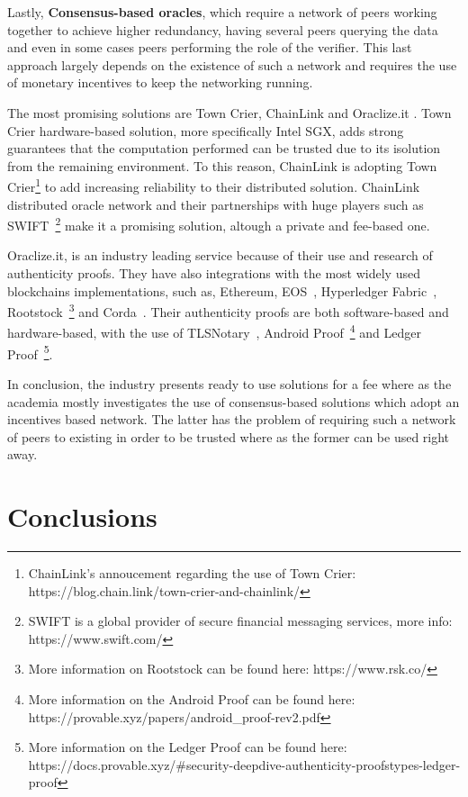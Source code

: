 Lastly, \textbf{Consensus-based oracles}, which require a network of peers working together to achieve higher redundancy, having several peers querying the data and even in some cases peers performing the role of the verifier. This last approach largely depends on the existence of such a network and requires the use of monetary incentives to keep the networking running.

The most promising solutions are Town Crier, ChainLink and Oraclize.it .  Town Crier hardware-based solution, more specifically Intel SGX, adds strong guarantees that the computation performed can be trusted due to its isolution from the remaining environment. To this reason, ChainLink is adopting Town Crier\footnote{ChainLink's annoucement regarding the use of Town Crier: https://blog.chain.link/town-crier-and-chainlink/} to add increasing reliability to their distributed solution. ChainLink distributed oracle network and their partnerships with huge players such as SWIFT~\footnote{SWIFT is a global provider
  of secure financial messaging services, more info: https://www.swift.com/} make it a promising solution, altough a private and fee-based one.

Oraclize.it, is an industry leading service because of their use and research of authenticity proofs. They have also integrations with the most widely used blockchains implementations, such as, Ethereum, EOS~\cite{Block.one2018}, Hyperledger Fabric~\cite{Androulaki}, Rootstock~\footnote{More information on Rootstock can be found here: https://www.rsk.co/} and Corda~\cite{Brown2016}. Their authenticity proofs are both software-based and hardware-based, with the use of TLSNotary~\cite{TLSNotary}, Android Proof~\footnote{More information on the Android Proof can be found here: https://provable.xyz/papers/android\_proof-rev2.pdf} and Ledger Proof~\footnote{More information on the Ledger Proof can be found here: https://docs.provable.xyz/\#security-deepdive-authenticity-proofstypes-ledger-proof}.

In conclusion, the industry presents ready to use solutions for a fee where as the academia mostly investigates the use of consensus-based solutions which adopt an incentives based network. The latter has the problem of requiring such a network of peers to existing in order to be trusted where as the former can be used right away.


\section{Conclusions}

